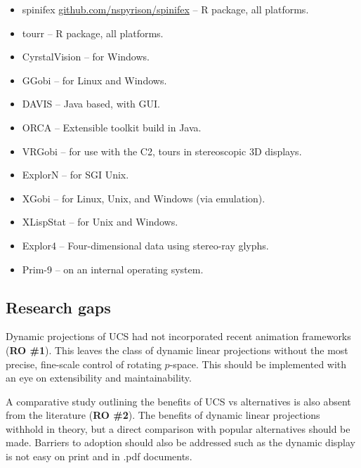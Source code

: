 \documentclass{monashthesis}
\begin{document}
\begin{itemize}
\tightlist
\item
  spinifex
  \href{https://github.com/nspyrison/spinifex}{github.com/nspyrison/spinifex}
  -- R package, all platforms.
\item
  tourr \autocite{wickham_tourr_2011} -- R package, all platforms.
\item
  CyrstalVision \autocite{wegman_visual_2003} -- for Windows.
\item
  GGobi \autocite{swayne_ggobi:_2003} -- for Linux and Windows.
\item
  DAVIS \autocite{huh_davis:_2002} -- Java based, with GUI.
\item
  ORCA \autocite{sutherland_orca:_2000} -- Extensible toolkit build in
  Java.
\item
  VRGobi \autocite{nelson_xgobi_1998} -- for use with the C2, tours in
  stereoscopic 3D displays.
\item
  ExplorN \autocite{carr_explorn:_1996} -- for SGI Unix.
\item
  XGobi \autocite{swayne_xgobi:_1991} -- for Linux, Unix, and Windows
  (via emulation).
\item
  XLispStat \autocite{tierney_lisp-stat:_1990} -- for Unix and Windows.
\item
  Explor4 \autocite{carr_explor4:_1988} -- Four-dimensional data using
  stereo-ray glyphs.
\item
  Prim-9 \autocites{asimov_grand_1985}{fisherkeller_prim-9:_1974} -- on
  an internal operating system.
\end{itemize}

\subsection{Research gaps}\label{research-gaps}

Dynamic projections of UCS had not incorporated recent animation
frameworks (\textbf{RO \#1}). This leaves the class of dynamic linear
projections without the most precise, fine-scale control of rotating
\(p\)-space. This should be implemented with an eye on extensibility and
maintainability.

A comparative study outlining the benefits of UCS vs alternatives is
also absent from the literature (\textbf{RO \#2}). The benefits of
dynamic linear projections withhold in theory, but a direct comparison
with popular alternatives should be made. Barriers to adoption should
also be addressed such as the dynamic display is not easy on print and
in .pdf documents.
\end{document}
